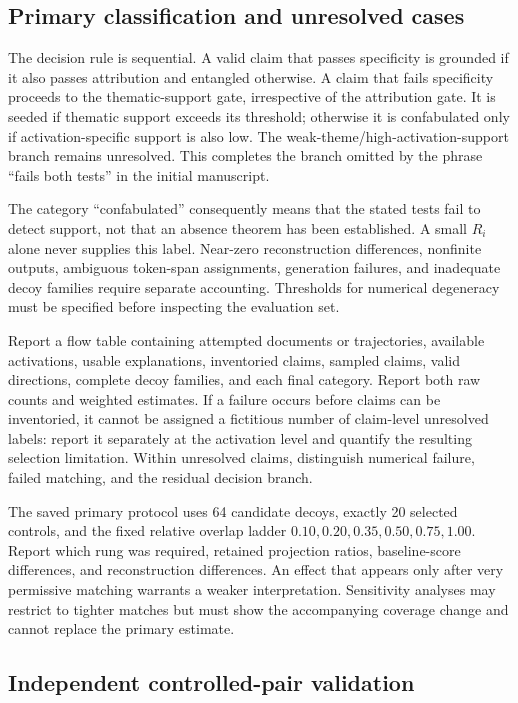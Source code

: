 \subsection{Primary classification and unresolved cases}

The decision rule is sequential. A valid claim that passes specificity is
grounded if it also passes attribution and entangled otherwise. A claim that
fails specificity proceeds to the thematic-support gate, irrespective of
the attribution gate. It is seeded if thematic support exceeds its threshold;
otherwise it is confabulated only if activation-specific support is also low.
The weak-theme/high-activation-support branch remains unresolved. This
completes the branch omitted by the phrase ``fails both tests'' in the
initial manuscript.

The category ``confabulated'' consequently means that the stated tests fail
to detect support, not that an absence theorem has been established. A small
$R_i$ alone never supplies this label. Near-zero reconstruction differences,
nonfinite outputs, ambiguous token-span assignments, generation failures,
and inadequate decoy families require separate accounting. Thresholds for
numerical degeneracy must be specified before inspecting the evaluation set.

Report a flow table containing attempted documents or trajectories, available
activations, usable explanations, inventoried claims, sampled claims, valid
directions, complete decoy families, and each final category. Report both raw
counts and weighted estimates. If a failure occurs before claims can be
inventoried, it cannot be assigned a fictitious number of claim-level unresolved
labels: report it separately at the activation level and quantify the resulting
selection limitation. Within unresolved claims, distinguish numerical failure,
failed matching, and the residual decision branch.

The saved primary protocol uses 64 candidate decoys, exactly 20 selected
controls, and the fixed relative overlap ladder
$0.10,0.20,0.35,0.50,0.75,1.00$. Report which rung was required, retained
projection ratios, baseline-score differences, and reconstruction differences.
An effect that appears only after very permissive matching warrants a weaker
interpretation. Sensitivity analyses may restrict to tighter matches but must
show the accompanying coverage change and cannot replace the primary estimate.

\subsection{Independent controlled-pair validation}

